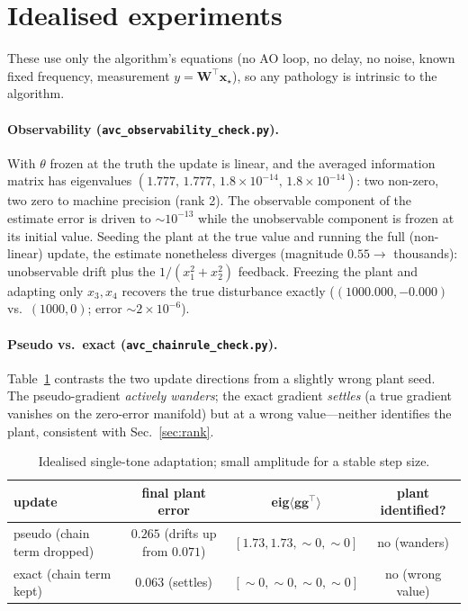 \documentclass[11pt]{article}
\newcommand{\vx}{\mathbf{x}}
\newcommand{\vW}{\mathbf{W}}
\newcommand{\vg}{\mathbf{g}}
\begin{document}
\section{Idealised experiments}
\label{sec:ideal}

These use only the algorithm's equations (no AO loop, no delay, no noise,
known fixed frequency, measurement $y=\vW^{\!\top}\vx_\star$), so any
pathology is intrinsic to the algorithm.

\paragraph{Observability (\texttt{avc\_observability\_check.py}).}
With $\theta$ frozen at the truth the update is linear, and the averaged
information matrix has eigenvalues
$(1.777,\,1.777,\,1.8\!\times\!10^{-14},\,1.8\!\times\!10^{-14})$: two
non-zero, two zero to machine precision (rank 2). The observable component
of the estimate error is driven to $\sim\!10^{-13}$ while the unobservable
component is frozen at its initial value. Seeding the plant at the true
value and running the full (non-linear) update, the estimate nonetheless
diverges (magnitude $0.55\!\to\!$ thousands): unobservable drift plus the
$1/(x_1^2+x_2^2)$ feedback. Freezing the plant and adapting only
$x_3,x_4$ recovers the true disturbance exactly
($(1000.000,-0.000)$ vs.\ $(1000,0)$; error $\sim\!2\times10^{-6}$).

\paragraph{Pseudo vs.\ exact (\texttt{avc\_chainrule\_check.py}).}
Table~\ref{tab:chain} contrasts the two update directions from a slightly
wrong plant seed. The pseudo-gradient \emph{actively wanders}; the exact
gradient \emph{settles} (a true gradient vanishes on the zero-error
manifold) but at a wrong value---neither identifies the plant, consistent
with Sec.~\ref{sec:rank}.

\begin{table}[h]
  \centering
  \begin{tabular}{lccc}
    \toprule
    update & final plant error & eig$\langle\vg\vg^{\!\top}\rangle$ & plant identified?\\
    \midrule
    pseudo (chain term dropped) & $0.265$ (drifts up from $0.071$) & $[1.73,1.73,\!\sim\!0,\!\sim\!0]$ & no (wanders)\\
    exact (chain term kept)     & $0.063$ (settles)               & $[\!\sim\!0,\!\sim\!0,\!\sim\!0,\!\sim\!0]$ & no (wrong value)\\
    \bottomrule
  \end{tabular}
  \caption{Idealised single-tone adaptation; small amplitude for a stable step size.}
  \label{tab:chain}
\end{table}
\end{document}
